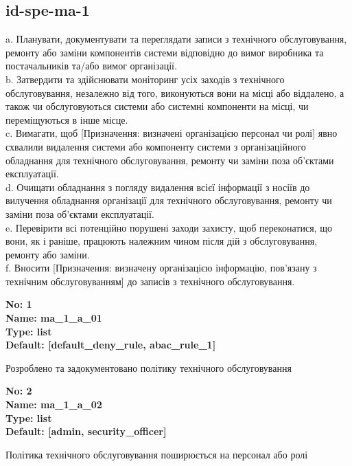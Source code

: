 \documentclass{article}
\begin{document}
\subsection{id-spe-ma-1}
a. Планувати, документувати та переглядати записи з технічного обслуговування, ремонту або заміни компонентів системи відповідно до вимог виробника та постачальників та/або вимог організації.\\ 
b. Затвердити та здійснювати моніторинг усіх заходів з технічного обслуговування, незалежно від того, виконуються вони на місці або віддалено, а також чи обслуговуються системи або системні компоненти на місці, чи переміщуються в інше місце.\\ 
c. Вимагати, щоб [Призначення: визначені організацією персонал чи ролі] явно схвалили видалення системи або компоненту системи з організаційного обладнання для технічного обслуговування, ремонту чи заміни поза об'єктами експлуатації.\\ 
d. Очищати обладнання з погляду видалення всієї інформації з носіїв до вилучення обладнання організації для технічного обслуговування, ремонту чи заміни поза об'єктами експлуатації.\\ 
e. Перевірити всі потенційно порушені заходи захисту, щоб переконатися, що вони, як і раніше, працюють належним чином після дій з обслуговування, ремонту або заміни.\\ 
f. Вносити [Призначення: визначену організацією інформацію, пов'язану з технічним обслуговуванням] до записів з технічного обслуговування.

\vspace{10pt}
{\footnotesize\bfseries
No: 1\\
Name: ma\_\allowbreak{}1\_\allowbreak{}a\_\allowbreak{}01\\
Type: list\\
Default: [\textquotedbl{}default\_\allowbreak{}deny\_\allowbreak{}rule\textquotedbl{}, \textquotedbl{}abac\_\allowbreak{}rule\_\allowbreak{}1\textquotedbl{}]
}

{\footnotesize Розроблено та задокументовано політику технічного обслуговування}


{\footnotesize\bfseries
No: 2\\
Name: ma\_\allowbreak{}1\_\allowbreak{}a\_\allowbreak{}02\\
Type: list\\
Default: [\textquotedbl{}admin\textquotedbl{}, \textquotedbl{}security\_\allowbreak{}officer\textquotedbl{}]
}

{\footnotesize Політика технічного обслуговування поширюється на персонал або ролі}
\end{document}
